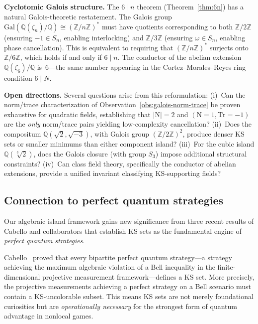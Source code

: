 \documentclass[12pt,a4paper]{article}
\newcommand{\Z}{\mathbb{Z}}
\newcommand{\Q}{\mathbb{Q}}
\begin{document}
\smallskip\noindent\textbf{Cyclotomic Galois structure.}  The 6\,$|\,$\,$n$ theorem (Theorem~\ref{thm:6n}) has a natural Galois-theoretic restatement.  The Galois group $\mathrm{Gal}(\Q(\zeta_n)/\Q) \cong (\Z/n\Z)^*$ must have quotients corresponding to both $\Z/2\Z$ (ensuring $-1 \in S_n$, enabling interlocking) and $\Z/3\Z$ (ensuring $\omega \in S_n$, enabling phase cancellation).  This is equivalent to requiring that $(\Z/n\Z)^*$ surjects onto $\Z/6\Z$, which holds if and only if $6 \mid n$.  The conductor of the abelian extension $\Q(\zeta_6)/\Q$ is~6---the same number appearing in the Cortez--Morales--Reyes ring condition $6 \mid N$.

\smallskip\noindent\textbf{Open directions.}  Several questions arise from this reformulation: (i)~Can the norm/trace characterization of Observation~\ref{obs:galois-norm-trace} be proven exhaustive for quadratic fields, establishing that $|\mathrm{N}| = 2$ and $(\mathrm{N} = 1, \mathrm{Tr} = -1)$ are the \emph{only} norm/trace pairs yielding low-complexity cancellation? (ii)~Does the compositum $\Q(\sqrt{2}, \sqrt{-3})$, with Galois group $(\Z/2\Z)^2$, produce denser KS sets or smaller minimums than either component island? (iii)~For the cubic island $\Q(\sqrt[3]{2})$, does the Galois closure (with group $S_3$) impose additional structural constraints? (iv)~Can class field theory, specifically the conductor of abelian extensions, provide a unified invariant classifying KS-supporting fields?

\subsection{Connection to perfect quantum strategies}\label{sec:cabello}

Our algebraic island framework gains new significance from three recent results of Cabello and collaborators that establish KS sets as the fundamental engine of \emph{perfect quantum strategies}.

Cabello~\cite{Cabello2024bipartite} proved that every bipartite perfect quantum strategy---a strategy achieving the maximum algebraic violation of a Bell inequality in the finite-dimensional projective measurement framework---defines a KS set. More precisely, the projective measurements achieving a perfect strategy on a Bell scenario must contain a KS-uncolorable subset. This means KS sets are not merely foundational curiosities but are \emph{operationally necessary} for the strongest form of quantum advantage in nonlocal games.
\end{document}
